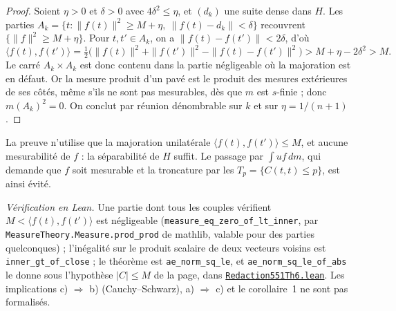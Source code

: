 \begin{proof}
Soient $\eta > 0$ et $\delta > 0$ avec $4\delta^2 \le \eta$, et $(d_k)$ une suite dense dans $H$. Les parties $A_k = \{t : \|f(t)\|^2 \ge M + \eta,\ \|f(t) - d_k\| < \delta\}$ recouvrent $\{\|f\|^2 \ge M + \eta\}$. Pour $t, t' \in A_k$, on a $\|f(t) - f(t')\| < 2\delta$, d'où
\[ \langle f(t), f(t') \rangle = \tfrac12\bigl(\|f(t)\|^2 + \|f(t')\|^2 - \|f(t) - f(t')\|^2\bigr) > M + \eta - 2\delta^2 > M. \]
Le carré $A_k \times A_k$ est donc contenu dans la partie négligeable où la majoration est en défaut. Or la mesure produit d'un pavé est le produit des mesures extérieures de ses côtés, même s'ils ne sont pas mesurables, dès que $m$ est $s$-finie ; donc $m(A_k)^2 = 0$. On conclut par réunion dénombrable sur $k$ et sur $\eta = 1/(n+1)$.
\end{proof}

\noindent La preuve n'utilise que la majoration unilatérale $\langle f(t), f(t') \rangle \le M$, et aucune mesurabilité de $f$ : la séparabilité de $H$ suffit. Le passage par $\int u f\,dm$, qui demande que $f$ soit mesurable et la troncature par les $T_p = \{C(t,t) \le p\}$, est ainsi évité.

\begin{sloppypar}
\noindent\emph{Vérification en Lean.} Une partie dont tous les couples vérifient $M < \langle f(t), f(t')\rangle$ est négligeable (\texttt{measure\_eq\_zero\_of\_lt\_inner}, par \texttt{MeasureTheory.\allowbreak{}Measure.\allowbreak{}prod\_prod} de mathlib, valable pour des parties quelconques) ; l'inégalité sur le produit scalaire de deux vecteurs voisins est \texttt{inner\_gt\_of\_close} ; le théorème est \texttt{ae\_norm\_sq\_le}, et \texttt{ae\_norm\_sq\_le\_of\_abs} le donne sous l'hypothèse $|C| \le M$ de la page, dans \href{\leanblobmain/Redaction551Th6.lean}{\texttt{Redaction551Th6.\allowbreak{}lean}}. Les implications c) $\Rightarrow$ b) (Cauchy--Schwarz), a) $\Rightarrow$ c) et le corollaire~1 ne sont pas formalisés.
\end{sloppypar}

